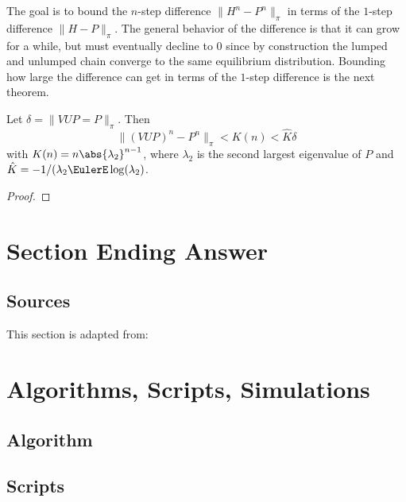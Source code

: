 \documentclass[12pt]{article}
\begin{document}
\begin{example}
The goal is to bound the $n$-step difference $\| H^n - P^n \|_{\pi}$ in
terms of the $1$-step difference $\| H - P\|_{\pi}$.  The general
behavior of the difference  is that it can grow for a while, but must
eventually decline to $0$ since by construction the lumped and
unlumped chain converge to the same equilibrium distribution.
Bounding how large the difference can get in terms of the $1$-step
difference is the next theorem.

\begin{theorem}
  Let $ \delta = \| VUP = P \|_{\pi}$.  Then
  \[
    \| (VUP)^n - P^n \|_{\pi} < K(n) < \hat{K} \delta
  \]
  with $K(n) = n \abs{\lambda_2}^{n-1}$, where $\lambda_2$ is the
  second largest eigenvalue of $P$ and $\hat{K} = -1/(\lambda_2
  \EulerE \log(\lambda_2)$.
\end{theorem}

\begin{proof}
  
\end{proof}

\section*{Section Ending Answer}

\subsection*{Sources}
This section is adapted from: 

\nocite{}
\nocite{}

\hr

\section*{Algorithms, Scripts, Simulations}

\subsection*{Algorithm}

\subsection*{Scripts}




\end{example}
\end{document}
